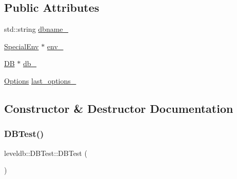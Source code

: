 \subsection*{Public Attributes}
\begin{DoxyCompactItemize}
\item 
std\+::string \mbox{\hyperlink{classleveldb_1_1_d_b_test_ab7eb9815f522ad154816d72d1cc23a86}{dbname\+\_\+}}
\item 
\mbox{\hyperlink{classleveldb_1_1_special_env}{Special\+Env}} $\ast$ \mbox{\hyperlink{classleveldb_1_1_d_b_test_ae6bb66675fe5419ed647efd1bfd332f8}{env\+\_\+}}
\item 
\mbox{\hyperlink{classleveldb_1_1_d_b}{DB}} $\ast$ \mbox{\hyperlink{classleveldb_1_1_d_b_test_a2c3db8773f1aa15128432a87489b0d5a}{db\+\_\+}}
\item 
\mbox{\hyperlink{structleveldb_1_1_options}{Options}} \mbox{\hyperlink{classleveldb_1_1_d_b_test_adc05df912917d8de411d0672af04330f}{last\+\_\+options\+\_\+}}
\end{DoxyCompactItemize}


\subsection{Constructor \& Destructor Documentation}
\mbox{\label{classleveldb_1_1_d_b_test_afc6fc9512e900de6ee10c5db15b22930}} 
\subsubsection{\texorpdfstring{DBTest()}{DBTest()}}
{\footnotesize\ttfamily leveldb\+::\+D\+B\+Test\+::\+D\+B\+Test (\begin{DoxyParamCaption}{ }\end{DoxyParamCaption})\hspace{0.3cm}{\ttfamily [inline]}}

